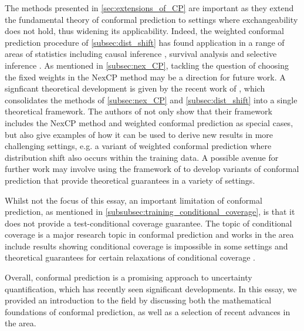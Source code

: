 \documentclass[11pt, titlepage]{article} %
\numberwithin{equation}{section}
\theoremstyle{definition}
\numberwithin{theorem}{section}
\numberwithin{lemma}{section}
\numberwithin{corollary}{section}
\numberwithin{proposition}{section}
\numberwithin{definition}{section}
\numberwithin{remark}{section}
\begin{document}
\noindent
The methods presented in \cref{sec:extensions_of_CP} are important as they extend the fundamental theory of conformal prediction to settings where exchangeability does not hold, thus widening its applicability. Indeed, the weighted conformal prediction procedure of \cref{subsec:dist_shift} has found application in a range of areas of statistics including causal inference \cite{lei2021conformal, jin2023sensitivity}, survival analysis \cite{candes2023survivalanalysis} and selective inference \cite{jin2023model}. As mentioned in \cref{subsec:nex_CP}, tackling the question of choosing the fixed weights in the NexCP method may be a direction for future work. A signficant theoretical development is given by the recent work of \cite{barber2025unifyingtheories}, which consolidates the methods of \cref{subsec:nex_CP} and \cref{subsec:dist_shift} into a single theoretical framework. The authors of \cite{barber2025unifyingtheories} not only show that their framework includes the NexCP method and weighted conformal prediction as special cases, but also give examples of how it can be used to derive new results in more challenging settings, e.g. a variant of weighted conformal prediction where distribution shift also occurs within the training data. A possible avenue for further work may involve using the framework of \cite{barber2025unifyingtheories} to develop variants of conformal prediction that provide theoretical guarantees in a variety of settings. \vskip5pt

\noindent
Whilst not the focus of this essay, an important limitation of conformal prediction, as mentioned in \cref{subsubsec:training_conditional_coverage}, is that it does not provide a test-conditional coverage guarantee. The topic of conditional coverage is a major research topic in conformal prediction and works in the area include results showing conditional coverage is impossible in some settings \cite{lei2014distribution} and theoretical guarantees for certain relaxations of conditional coverage \cite{gibbs2025conformal}. \vskip5pt

\noindent
Overall, conformal prediction is a promising approach to uncertainty quantification, which has recently seen significant developments. In this essay, we provided an introduction to the field by discussing both the mathematical foundations of conformal prediction, as well as a selection of recent advances in the area.


%                                                                             
%                                                                             
\end{document}
